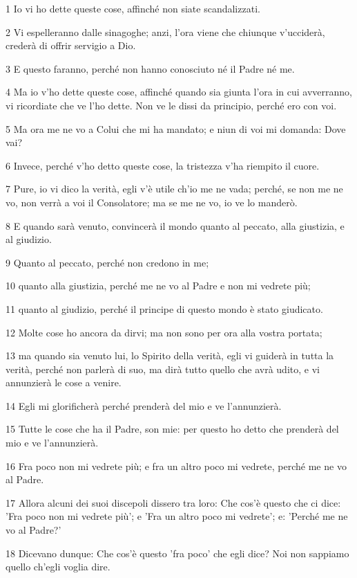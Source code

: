 \par 1 Io vi ho dette queste cose, affinché non siate scandalizzati.
\par 2 Vi espelleranno dalle sinagoghe; anzi, l'ora viene che chiunque v'ucciderà, crederà di offrir servigio a Dio.
\par 3 E questo faranno, perché non hanno conosciuto né il Padre né me.
\par 4 Ma io v'ho dette queste cose, affinché quando sia giunta l'ora in cui avverranno, vi ricordiate che ve l'ho dette. Non ve le dissi da principio, perché ero con voi.
\par 5 Ma ora me ne vo a Colui che mi ha mandato; e niun di voi mi domanda: Dove vai?
\par 6 Invece, perché v'ho detto queste cose, la tristezza v'ha riempito il cuore.
\par 7 Pure, io vi dico la verità, egli v'è utile ch'io me ne vada; perché, se non me ne vo, non verrà a voi il Consolatore; ma se me ne vo, io ve lo manderò.
\par 8 E quando sarà venuto, convincerà il mondo quanto al peccato, alla giustizia, e al giudizio.
\par 9 Quanto al peccato, perché non credono in me;
\par 10 quanto alla giustizia, perché me ne vo al Padre e non mi vedrete più;
\par 11 quanto al giudizio, perché il principe di questo mondo è stato giudicato.
\par 12 Molte cose ho ancora da dirvi; ma non sono per ora alla vostra portata;
\par 13 ma quando sia venuto lui, lo Spirito della verità, egli vi guiderà in tutta la verità, perché non parlerà di suo, ma dirà tutto quello che avrà udito, e vi annunzierà le cose a venire.
\par 14 Egli mi glorificherà perché prenderà del mio e ve l'annunzierà.
\par 15 Tutte le cose che ha il Padre, son mie: per questo ho detto che prenderà del mio e ve l'annunzierà.
\par 16 Fra poco non mi vedrete più; e fra un altro poco mi vedrete, perché me ne vo al Padre.
\par 17 Allora alcuni dei suoi discepoli dissero tra loro: Che cos'è questo che ci dice: 'Fra poco non mi vedrete più'; e 'Fra un altro poco mi vedrete'; e: 'Perché me ne vo al Padre?'
\par 18 Dicevano dunque: Che cos'è questo 'fra poco' che egli dice? Noi non sappiamo quello ch'egli voglia dire.
